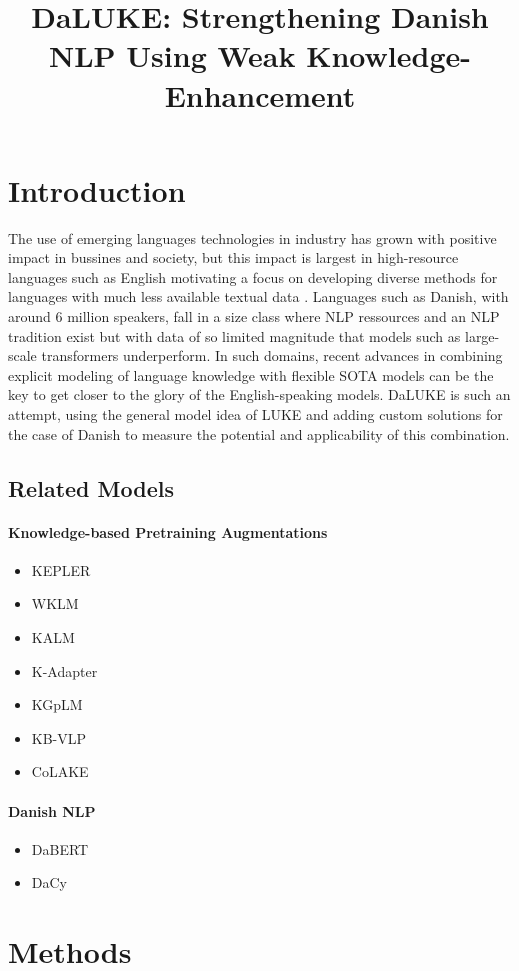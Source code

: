 \documentclass[10pt, a4paper]{article}
\title{DaLUKE: Strengthening Danish NLP Using Weak Knowledge-Enhancement}
\begin{document}
\maketitleabstract

\section{Introduction}
The use of emerging languages technologies in industry has grown with positive impact in bussines and society, but this impact is largest in high-resource languages such as English motivating a focus on developing diverse methods for languages with much less available textual data \cite{hedderich2021survey}.
Languages such as Danish, with around 6 million speakers, fall in a size class where NLP ressources and an NLP tradition exist but with data of so limited magnitude that models such as large-scale transformers underperform.
In such domains, recent advances in combining explicit modeling of language knowledge with flexible SOTA models can be the key to get closer to the glory of the English-speaking models.
DaLUKE is such an attempt, using the general model idea of LUKE \cite{yamada2020luke} and adding custom solutions for the case of Danish to measure the potential and applicability of this combination.


\subsection{Related Models}
\paragraph{Knowledge-based Pretraining Augmentations}
\begin{itemize}
    \item KEPLER
    \item WKLM
    \item KALM
    \item K-Adapter
    \item KGpLM
    \item KB-VLP
    \item CoLAKE
\end{itemize}
\paragraph{Danish NLP}
\begin{itemize}
    \item DaBERT
    \item DaCy
\end{itemize}


\section{Methods}
\end{document}

